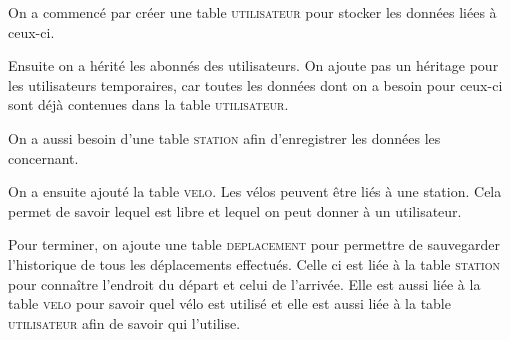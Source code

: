 \documentclass[a4paper, 12pt]{report}
\begin{document}
On a commencé par créer une table \textsc{utilisateur} pour stocker les données liées à ceux-ci.

Ensuite  on a hérité les abonnés des utilisateurs. On ajoute pas un héritage pour les utilisateurs temporaires, car toutes les données dont on a besoin pour ceux-ci sont déjà contenues dans la table \textsc{utilisateur}.

On a aussi besoin d'une table \textsc{station} afin d'enregistrer les données les concernant.

On a ensuite ajouté la table \textsc{velo}. Les vélos peuvent être liés à une station. Cela permet de savoir lequel est libre et lequel on peut donner à un utilisateur.

Pour terminer, on ajoute une table \textsc{deplacement} pour permettre de sauvegarder l'historique de tous les déplacements effectués. Celle ci est liée à la table \textsc{station} pour connaître l'endroit du départ et celui de l'arrivée. Elle est aussi liée à la table \textsc{velo} pour savoir quel vélo est utilisé et elle est aussi liée à la table \textsc{utilisateur} afin de savoir qui l'utilise.
\end{document}

